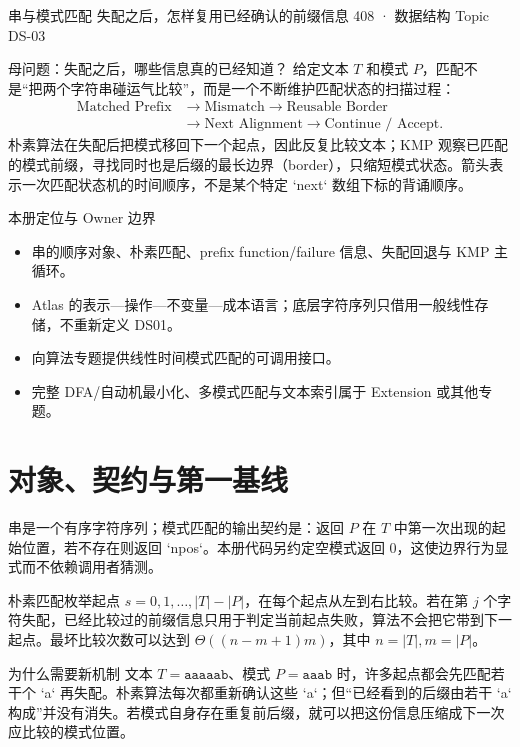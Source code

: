 \documentclass[UTF8,fontset=none,11pt,a4paper]{ctexart}
\begin{document}
\handbooktitle
  {串与模式匹配}
  {失配之后，怎样复用已经确认的前缀信息}
  {408 · 数据结构 Topic DS-03}

\begin{corebox}{母问题：失配之后，哪些信息真的已经知道？}
给定文本 $T$ 和模式 $P$，匹配不是“把两个字符串碰运气比较”，而是一个不断维护匹配状态的扫描过程：
\[
\begin{aligned}
\text{Matched Prefix}&\to\text{Mismatch}\to\text{Reusable Border}\\
&\to\text{Next Alignment}\to\text{Continue / Accept}.
\end{aligned}
\]
朴素算法在失配后把模式移回下一个起点，因此反复比较文本；KMP 观察已匹配的模式前缀，寻找同时也是后缀的最长边界（border），只缩短模式状态。箭头表示一次匹配状态机的时间顺序，不是某个特定 `next` 数组下标的背诵顺序。
\end{corebox}

\begin{methodbox}{本册定位与 Owner 边界}
\begin{itemize}
\item {}串的顺序对象、朴素匹配、prefix function/failure 信息、失配回退与 KMP 主循环。
\item {}Atlas 的表示—操作—不变量—成本语言；底层字符序列只借用一般线性存储，不重新定义 DS01。
\item {}向算法专题提供线性时间模式匹配的可调用接口。
\item {}完整 DFA/自动机最小化、多模式匹配与文本索引属于 Extension 或其他专题。
\end{itemize}
\end{methodbox}

\tableofcontents\newpage

\section{对象、契约与第一基线}
串是一个有序字符序列；模式匹配的输出契约是：返回 $P$ 在 $T$ 中第一次出现的起始位置，若不存在则返回 `npos`。本册代码另约定空模式返回 0，这使边界行为显式而不依赖调用者猜测。

朴素匹配枚举起点 $s=0,1,\ldots,|T|-|P|$，在每个起点从左到右比较。若在第 $j$ 个字符失配，已经比较过的前缀信息只用于判定当前起点失败，算法不会把它带到下一起点。最坏比较次数可以达到 $\Theta((n-m+1)m)$，其中 $n=|T|,m=|P|$。

\begin{examplebox}{为什么需要新机制}
文本 $T=\texttt{aaaaab}$、模式 $P=\texttt{aaab}$ 时，许多起点都会先匹配若干个 `a` 再失配。朴素算法每次都重新确认这些 `a`；但“已经看到的后缀由若干 `a` 构成”并没有消失。若模式自身存在重复前后缀，就可以把这份信息压缩成下一次应比较的模式位置。
\end{examplebox}
\end{document}
